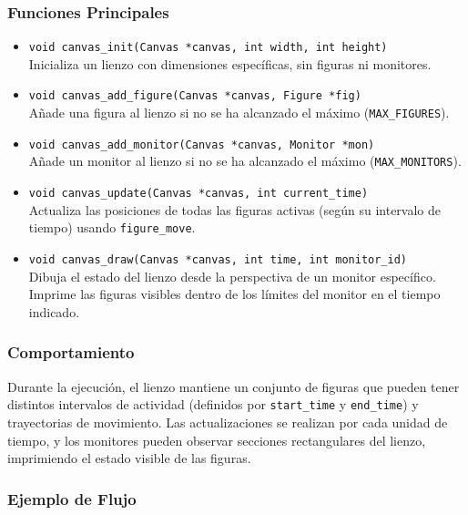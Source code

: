 \documentclass[12pt]{article}
\begin{document}
\subsubsection*{Funciones Principales}

\begin{itemize}
    \item \texttt{void canvas\_init(Canvas *canvas, int width, int height)}\\
    Inicializa un lienzo con dimensiones específicas, sin figuras ni monitores.

    \item \texttt{void canvas\_add\_figure(Canvas *canvas, Figure *fig)}\\
    Añade una figura al lienzo si no se ha alcanzado el máximo (\texttt{MAX\_FIGURES}).

    \item \texttt{void canvas\_add\_monitor(Canvas *canvas, Monitor *mon)}\\
    Añade un monitor al lienzo si no se ha alcanzado el máximo (\texttt{MAX\_MONITORS}).

    \item \texttt{void canvas\_update(Canvas *canvas, int current\_time)}\\
    Actualiza las posiciones de todas las figuras activas (según su intervalo de tiempo) usando \texttt{figure\_move}.

    \item \texttt{void canvas\_draw(Canvas *canvas, int time, int monitor\_id)}\\
    Dibuja el estado del lienzo desde la perspectiva de un monitor específico. Imprime las figuras visibles dentro de los límites del monitor en el tiempo indicado.
\end{itemize}

\subsubsection*{Comportamiento}

Durante la ejecución, el lienzo mantiene un conjunto de figuras que pueden tener distintos intervalos de actividad (definidos por \texttt{start\_time} y \texttt{end\_time}) y trayectorias de movimiento. Las actualizaciones se realizan por cada unidad de tiempo, y los monitores pueden observar secciones rectangulares del lienzo, imprimiendo el estado visible de las figuras.

\subsubsection*{Ejemplo de Flujo}
\end{document}
